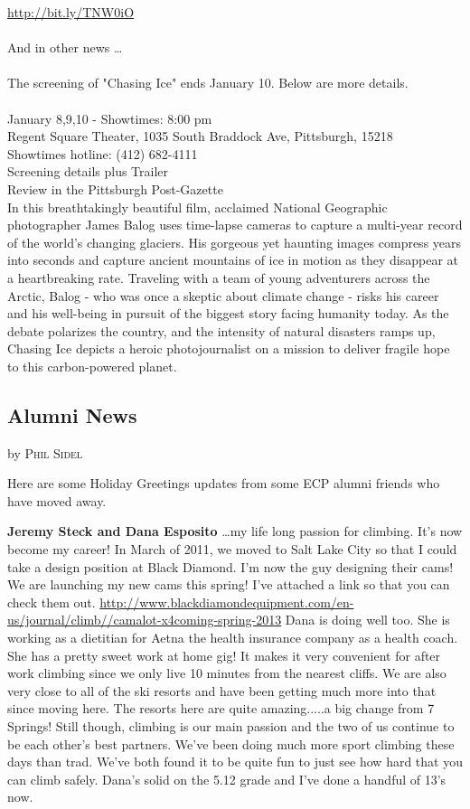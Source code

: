 \documentclass[10pt,a4paper]{article}
\newcommand{\NewsItem}[1]{%
		\usefont{T1}{augie}{m}{n} 	
		\large \bf #1 \vspace{4pt}
		\par \normalsize \normalfont}
\newcommand{\NewsAuthor}[1]{%
			\hfill by \textsc{#1} \vspace{4pt}
			\par \normalfont}
\newcommand\subsect[1]{%
  \subsection*{#1}%
  \addcontentsline{toc}{subsection}{#1}}
\begin{document}
\begin{multicols}{2}
\url{http://bit.ly/TNW0iO}
\\
\\
And in other news \dots
\\
\\
The screening of "Chasing Ice" ends January 10.  Below are more details.
\\
\\
January 8,9,10 - Showtimes: 8:00 pm\\
Regent Square Theater, 1035 South Braddock Ave, Pittsburgh, 15218 \\
Showtimes hotline: (412) 682-4111\\
Screening details plus Trailer\\
Review in the Pittsburgh Post-Gazette\\
In this breathtakingly beautiful film, acclaimed National Geographic photographer James Balog uses time-lapse cameras to capture a multi-year record of the world's changing glaciers. His gorgeous yet haunting images compress years into seconds and capture ancient mountains of ice in motion as they disappear at a heartbreaking rate. Traveling with a team of young adventurers across the Arctic, Balog - who was once a skeptic about climate change - risks his career and his well-being in pursuit of the biggest story facing humanity today. As the debate polarizes the country, and the intensity of natural disasters ramps up, Chasing Ice depicts a heroic photojournalist on a mission to deliver fragile hope to this carbon-powered planet. 

\subsect{Alumni News}

\NewsItem{}
\NewsAuthor{Phil Sidel}
Here are some Holiday Greetings updates from some ECP alumni friends who have moved away.

\vspace{10pt}

\textbf{Jeremy Steck and Dana Esposito}
\dots my life long passion for climbing.   It's now become my career!   In March of 2011, we moved to Salt Lake City so that I could take a design position at Black Diamond.   I'm now the guy designing their cams!   We are launching my new cams this spring!  I've attached a link so that you can check them out.
\url{http://www.blackdiamondequipment.com/en-us/journal/climb//camalot-x4coming-spring-2013}
Dana is doing well too.  She is working as a dietitian for Aetna the health insurance company as a health coach.    She has a pretty sweet work at home gig!   It makes it very convenient for after work climbing since we only live 10 minutes from the nearest cliffs.  We are also very close to all of the ski resorts and have been getting much more into that since moving here.   The resorts here are quite amazing.....a big change from 7 Springs!    Still though, climbing is our main passion and the two of us continue to be each other's best partners.   We've been doing much more sport climbing these days than trad.  We've both found it to be quite fun to just see how hard that you can climb safely.   Dana's solid on the 5.12 grade and I've done a handful of 13's now.    



\end{multicols}
\end{document}
